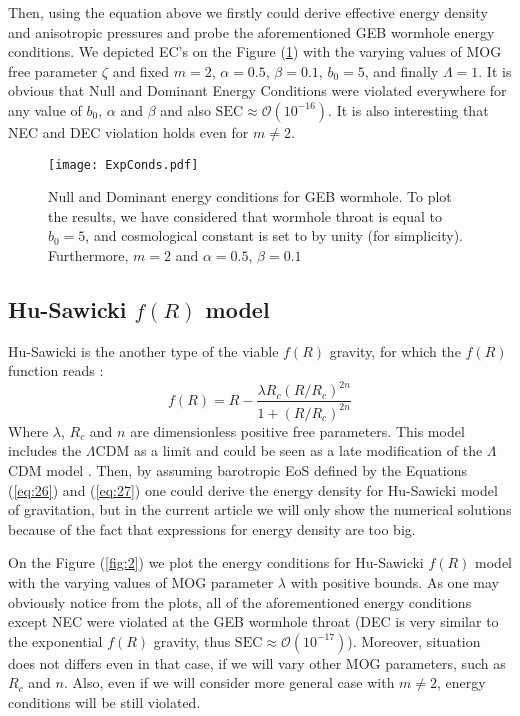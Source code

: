 Then, using the equation above we firstly could derive effective energy density and anisotropic pressures and probe the aforementioned GEB wormhole energy conditions. We depicted EC's on the Figure (\ref{fig:1}) with the varying values of MOG free parameter $\zeta$ and fixed $m=2$, $\alpha=0.5$, $\beta=0.1$, $b_0=5$, and finally $\Lambda=1$. It is obvious that Null and Dominant Energy Conditions were violated everywhere for any value of $b_0$, $\alpha$ and $\beta$ and also $\mathrm{SEC}\approx\mathcal{O}(10^{-16})$. It is also interesting that NEC and DEC violation holds even for $m\neq2$. 


\begin{widetext}
\begin{figure}[!htbp]
    \centering
    \texttt{[image: ExpConds.pdf]}
    \caption{Null and Dominant energy conditions for GEB wormhole. To plot the results, we have considered that wormhole throat is equal to $b_0=5$, and cosmological constant is set to by unity (for simplicity). Furthermore, $m=2$ and $\alpha=0.5$, $\beta=0.1$}
    \label{fig:1}
\end{figure}
\end{widetext}

\subsection{Hu-Sawicki $f(R)$ model}

Hu-Sawicki is the another type of the viable $f(R)$ gravity, for which the $f(R)$ function reads \cite{ref71}:
\begin{equation}
    f(R)=R-\frac{\lambda R_c (R/R_c)^{2n}}{1+(R/R_c)^{2n}}
\end{equation}
Where $\lambda$, $R_c$ and $n$ are dimensionless positive free parameters. This model includes the $\Lambda$CDM as a limit and could be seen as a late modification of the $\Lambda$CDM model \cite{ref72}. Then, by assuming barotropic EoS defined by the Equations (\ref{eq:26}) and (\ref{eq:27}) one could derive the energy density for Hu-Sawicki model of gravitation, but in the current article we will only show the numerical solutions because of the fact that expressions for energy density are too big.

On the Figure (\ref{fig:2}) we plot the energy conditions for Hu-Sawicki $f(R)$ model with the varying values of MOG parameter $\lambda$ with positive bounds. As one may obviously notice from the plots, all of the aforementioned energy conditions except NEC were violated at the GEB wormhole throat (DEC is very similar to the exponential $f(R)$ gravity, thus $\mathrm{SEC}\approx \mathcal{O}(10^{-17})$). Moreover, situation does not differs even in that case, if we will vary other MOG parameters, such as $R_c$ and $n$. Also, even if we will consider more general case with $m\neq2$, energy conditions will be still violated.

